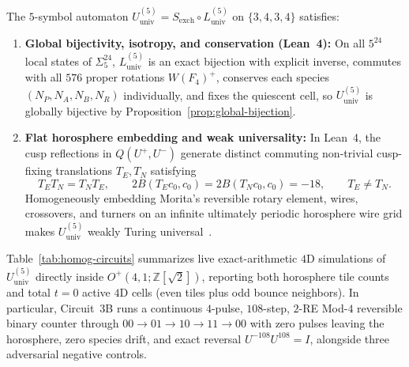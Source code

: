 \begin{theorem}
\label{thm:homog-weak-univ}
The $5$-symbol automaton $U_{\mathrm{univ}}^{(5)} = S_{\mathrm{exch}} \circ L_{\mathrm{univ}}^{(5)}$ on $\{3,4,3,4\}$ satisfies:
\begin{enumerate}
\item \textbf{Global bijectivity, isotropy, and conservation (Lean~4):} On all $5^{24}$ local states of $\Sigma_5^{24}$, $L_{\mathrm{univ}}^{(5)}$ is an exact bijection with explicit inverse, commutes with all $576$ proper rotations $W(F_4)^+$, conserves each species $(N_P, N_A, N_B, N_R)$ individually, and fixes the quiescent cell, so $U_{\mathrm{univ}}^{(5)}$ is globally bijective by Proposition~\ref{prop:global-bijection}.
\item \textbf{Flat horosphere embedding and weak universality:} In Lean~4, the cusp reflections in $Q(U^+, U^-)$ generate distinct commuting non-trivial cusp-fixing translations $T_E, T_N$ satisfying
\begin{equation}
\label{eq:horo-trans}
T_E T_N = T_N T_E, \qquad 2B(T_E c_0, c_0) = 2B(T_N c_0, c_0) = -18, \qquad T_E \neq T_N.
\end{equation}
Homogeneously embedding Morita's reversible rotary element, wires, crossovers, and turners on an infinite ultimately periodic horosphere wire grid makes $U_{\mathrm{univ}}^{(5)}$ weakly Turing universal~\cite{morita2001,morita2017book}.
\end{enumerate}
\end{theorem}

Table~\ref{tab:homog-circuits} summarizes live exact-arithmetic $4\mathrm{D}$ simulations of $U_{\mathrm{univ}}^{(5)}$ directly inside $O^+(4,1;\mathbb{Z}[\sqrt{2}])$, reporting both horosphere tile counts and total $t = 0$ active $4\mathrm{D}$ cells (even tiles plus odd bounce neighbors). In particular, Circuit~3B runs a continuous $4$-pulse, $108$-step, $2$-RE Mod-$4$ reversible binary counter through $00 \to 01 \to 10 \to 11 \to 00$ with zero pulses leaving the horosphere, zero species drift, and exact reversal $U^{-108} U^{108} = I$, alongside three adversarial negative controls.

